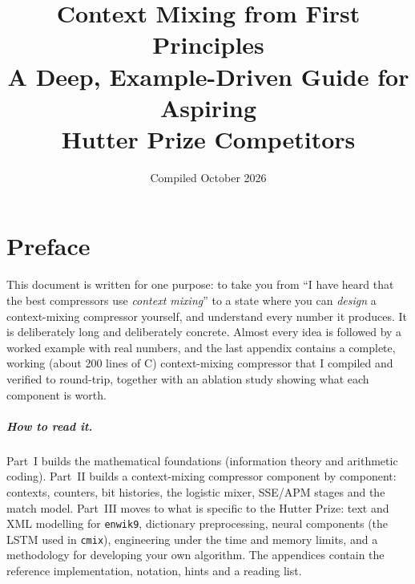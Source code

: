 \documentclass[11pt,a4paper,openany]{book}
\title{\Huge\bfseries Context Mixing from First Principles\\[0.4em]
\Large A Deep, Example-Driven Guide for Aspiring\\ Hutter Prize Competitors}
\author{}
\date{Compiled October 2026}
\newcommand{\code}[1]{\texttt{#1}}
\theoremstyle{definition}
\theoremstyle{remark}
\begin{document}
\frontmatter
\maketitle

\chapter*{Preface}

This document is written for one purpose: to take you from ``I have heard that the best compressors use \emph{context mixing}'' to a state where you can \emph{design} a context-mixing compressor yourself, and understand every number it produces. It is deliberately long and deliberately concrete. Almost every idea is followed by a worked example with real numbers, and the last appendix contains a complete, working (about 200 lines of C) context-mixing compressor that I compiled and verified to round-trip, together with an ablation study showing what each component is worth.

\paragraph{How to read it.}
Part~I builds the mathematical foundations (information theory and arithmetic coding). Part~II builds a context-mixing compressor component by component: contexts, counters, bit histories, the logistic mixer, SSE/APM stages and the match model. Part~III moves to what is specific to the Hutter Prize: text and XML modelling for \code{enwik9}, dictionary preprocessing, neural components (the LSTM used in \code{cmix}), engineering under the time and memory limits, and a methodology for developing your own algorithm. The appendices contain the reference implementation, notation, hints and a reading list.
\end{document}
